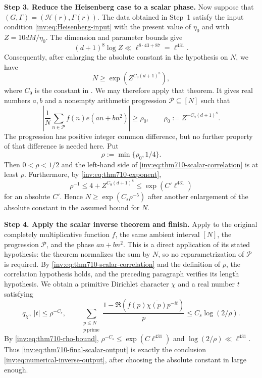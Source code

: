 \documentclass[twoside]{aomart}
\makeatletter
\theoremstyle{paperplain}
\theoremstyle{paperdefinition}
\renewenvironment{proof}[1][\proofname]{\par\pushQED{\qed}%
  \normalfont\topsep6\p@\@plus3\p@\relax\trivlist
  \item[\hskip\labelsep\itshape #1\@addpunct{.}]\ignorespaces
}{\popQED\endtrivlist\@endpefalse}
\numberwithin{equation}{section}
\makeatother
\begin{document}
\begin{proof}
\par
\medskip
\noindent\textbf{Step 3. Reduce the Heisenberg case to a scalar phase.}
Now suppose that $(G,\Gamma)=(\mathcal H(r),\Gamma(r))$.  The data obtained
in Step~1 satisfy the input condition
\eqref{inv:eq:Heisenberg-input} with the present value of $\eta_0$ and with
$Z=10dM/\eta_0$.  The dimension and parameter bounds give
\begin{equation}
 (d+1)^8\log Z\ll\ell^{8\cdot43+87}=\ell^{431}.
 \label{inv:eq:thm710-exponent}
\end{equation}
Consequently, after enlarging the absolute constant in the hypothesis on
$N$, we have
\[
 N\ge\exp\!\left(Z^{C_9(d+1)^8}\right),
\]
where $C_9$ is the constant in .
We may therefore apply that theorem.  It gives real numbers $a,b$ and a
nonempty arithmetic progression $\mathcal P\subseteq[N]$ such that
\begin{equation}
 \left|\frac1N\sum_{n\in\mathcal P}
 f(n)e(an+bn^2)\right|\ge\rho_0,
 \qquad \rho_0:=Z^{-C_9(d+1)^8}.
 \label{inv:eq:thm710-scalar-correlation}
\end{equation}
The progression has positive integer common difference, but no further
property of that difference is needed here.  Put
\[
 \rho:=\min\{\rho_0,1/4\}.
\]
Then $0<\rho<1/2$ and the left-hand side of
\eqref{inv:eq:thm710-scalar-correlation} is at least $\rho$.
Furthermore, by \eqref{inv:eq:thm710-exponent},
\begin{equation}
 \rho^{-1}\le 4+Z^{C_9(d+1)^8}
 \le\exp(C'\ell^{431})
 \label{inv:eq:thm710-rho-bound}
\end{equation}
for an absolute $C'$.  Hence
$N\ge\exp(C_s\rho^{-5})$ after another enlargement of the absolute
constant in the assumed bound for $N$.

\par
\medskip
\noindent\textbf{Step 4. Apply the scalar inverse theorem and finish.}
Apply  to the original completely
multiplicative function $f$, the same ambient interval $[N]$, the
progression $\mathcal P$, and the phase $an+bn^2$.  This is a direct
application of its stated hypothesis: the theorem normalizes the sum by
$N$, so no reparametrization of $\mathcal P$ is required.  By
\eqref{inv:eq:thm710-scalar-correlation} and the definition of $\rho$,
the correlation hypothesis holds, and the preceding paragraph verifies its
length hypothesis.  We obtain a primitive Dirichlet character $\chi$ and a
real number $t$ satisfying
\begin{equation}
 q_\chi,\ |t|\le\rho^{-C_s},
 \qquad
 \sum_{\substack{p\le N\\p\ \mathrm{prime}}}\frac{1-\Re(f(p)\overline{\chi(p)}p^{-it})}{p}
 \le C_s\log(2/\rho).
 \label{inv:eq:thm710-final-scalar-output}
\end{equation}
By \eqref{inv:eq:thm710-rho-bound},
$\rho^{-C_s}\le\exp(C\ell^{431})$ and
$\log(2/\rho)\ll\ell^{431}$.  Thus \eqref{inv:eq:thm710-final-scalar-output}
is exactly the conclusion
\eqref{inv:eq:numerical-inverse-output}, after choosing the absolute
constant in  large enough.
\end{proof}
\end{document}
